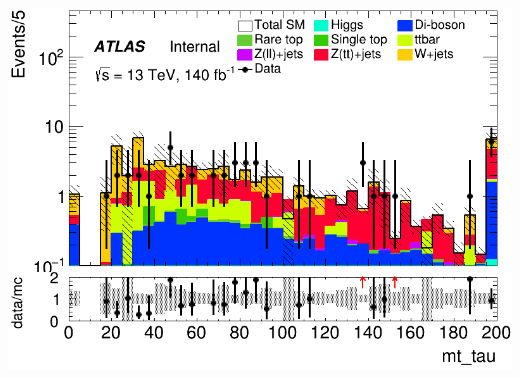 \documentclass[usenames,dvipsnames]{beamer}
\begin{document}
\begin{frame}
\begin{minipage}{0.32\textwidth}
        \includegraphics[width=\textwidth]{graphics/HHH_met/HHH_met_mt_tau.png}
    \end{minipage}
    
    \vspace{0.5cm} %


\end{frame}
\end{document}
